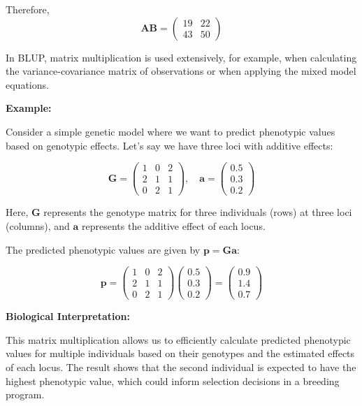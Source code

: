 \documentclass[12pt,a4paper]{article}
\newenvironment{example}[1][]
{\begin{basebox}[linecolor=uqgold]
\textbf{\color{uqgold}Example:} \textit{#1}\par\noindent\ignorespaces}
{\end{basebox}}
\newenvironment{interpretation}[1][]
{\begin{basebox}[linecolor=uqgreen]
\textbf{\color{uqgreen}Biological Interpretation:} \textit{#1}\par\noindent\ignorespaces}
{\end{basebox}}
\begin{document}
Therefore, $$\mathbf{AB} = \begin{pmatrix} 19 & 22 \\ 43 & 50 \end{pmatrix}$$

In BLUP, matrix multiplication is used extensively, for example, when calculating the variance-covariance matrix of observations or when applying the mixed model equations.

\begin{example}
Consider a simple genetic model where we want to predict phenotypic values based on genotypic effects. Let's say we have three loci with additive effects:

\[
\mathbf{G} = \begin{pmatrix}
    1 & 0 & 2 \\
    2 & 1 & 1 \\
    0 & 2 & 1
\end{pmatrix}, \quad
\mathbf{a} = \begin{pmatrix}
    0.5 \\
    0.3 \\
    0.2
\end{pmatrix}
\]

Here, $\mathbf{G}$ represents the genotype matrix for three individuals (rows) at three loci (columns), and $\mathbf{a}$ represents the additive effect of each locus.

The predicted phenotypic values are given by $\mathbf{p} = \mathbf{G}\mathbf{a}$:

\[
\mathbf{p} = \begin{pmatrix}
    1 & 0 & 2 \\
    2 & 1 & 1 \\
    0 & 2 & 1
\end{pmatrix}
\begin{pmatrix}
    0.5 \\
    0.3 \\
    0.2
\end{pmatrix}
= \begin{pmatrix}
    0.9 \\
    1.4 \\
    0.7
\end{pmatrix}
\]
\end{example}

\begin{interpretation}
This matrix multiplication allows us to efficiently calculate predicted phenotypic values for multiple individuals based on their genotypes and the estimated effects of each locus. The result shows that the second individual is expected to have the highest phenotypic value, which could inform selection decisions in a breeding program.
\end{interpretation}
\end{document}
